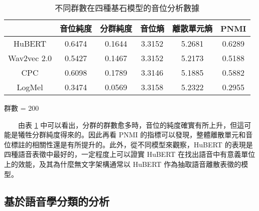 \begin{table}[!htbp]
            \vspace{0.5cm}        

            \begin{subtable}[t]{\textwidth}
                \centering
                \begin{tabular}{|c|c|c|c|c|c|} \hline 
                                & 音位純度 & 分群純度 & 音位熵 & 離散單元熵 &    PNMI \\ \hline 
                    HuBERT      &   0.6474 &   0.1644 & 3.3152 &     5.2681 & 0.6289 \\ \hline    %
                    Wav2vec 2.0 &   0.5427 &   0.1467 & 3.3152 &     5.2173 & 0.5188 \\ \hline    %
                    CPC         &   0.6098 &   0.1789 & 3.3146 &     5.1885 & 0.5882 \\ \hline    %
                    LogMel      &   0.3474 &   0.0569 & 3.3158 &     5.2322 & 0.2955 \\ \hline    %
                \end{tabular}
                \caption{群數 = 200}
                \label{tab:ch3-clu200-phn}
            \end{subtable}        

            \caption{不同群數在四種基石模型的音位分析數據}
            \label{tab:single-cluster-results}
        \end{table}

　　由表 \ref{tab:single-cluster-results} 中可以看出，分群的群數愈多時，音位的純度確實有所上升，但這可能是犧牲分群純度得來的。因此再看 PNMI 的指標可以發現，整體離散單元和音位標註的相關性還是有所提升的。此外，從不同模型來觀察，HuBERT 的表現是四種語音表徵中最好的，一定程度上可以證實 HuBERT 在找出語音中有意義單位上的效能，及其為什麼無文字架構通常以 HuBERT 作為抽取語音離散表徵的模型。

\subsection{基於語音學分類的分析}


